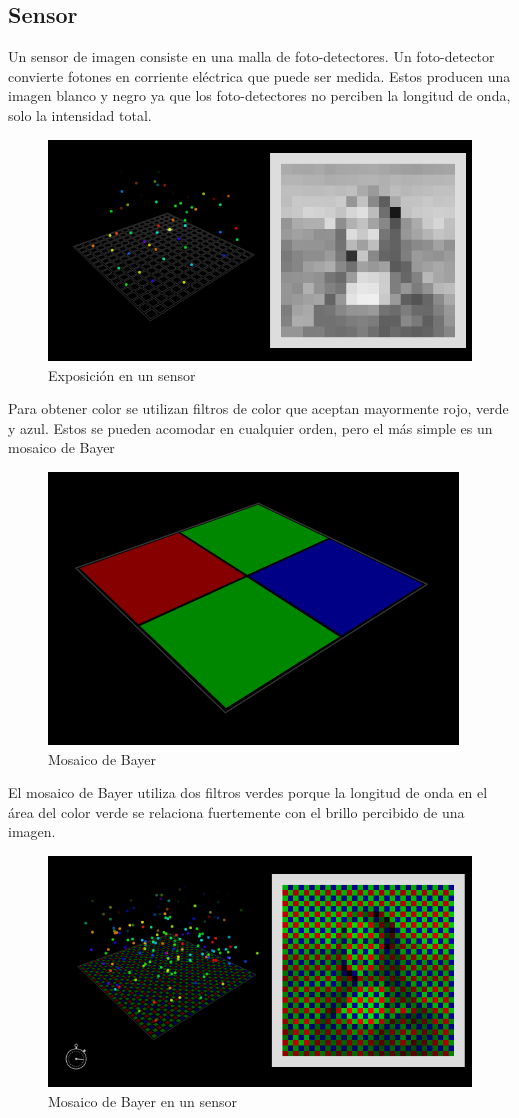\documentclass{article}
\begin{document}
\subsection{Sensor}

Un sensor de imagen consiste en una malla de foto-detectores. Un foto-detector convierte fotones en corriente eléctrica que puede ser medida. Estos producen una imagen blanco y negro ya que los foto-detectores no perciben la longitud de onda, solo la intensidad total.

\begin{figure}[H]
	\centering
	\includegraphics[width=0.65\linewidth]{Figuras/Sensor_blanco_y_negro}
	\caption{Exposición en un sensor}
	\label{fig:sensorblancoynegro}
\end{figure}


Para obtener color se utilizan filtros de color que aceptan mayormente rojo, verde y azul. Estos se pueden acomodar en cualquier orden, pero el más simple es un mosaico de Bayer

\begin{figure}[H]
	\centering
	\includegraphics[width=0.65\linewidth]{Figuras/Mosaico_de_Bayer}
	\caption{Mosaico de Bayer}
	\label{fig:mosaicodebayer}
\end{figure}


El mosaico de Bayer utiliza dos filtros verdes porque la longitud de onda en el área del color verde se relaciona fuertemente con el brillo percibido de una imagen.

\begin{figure}[H]
	\centering
	\includegraphics[width=0.65\linewidth]{Figuras/Sensor_Bayer}
	\caption{Mosaico de Bayer en un sensor}
	\label{fig:sensorbayer}
\end{figure}
\end{document}
